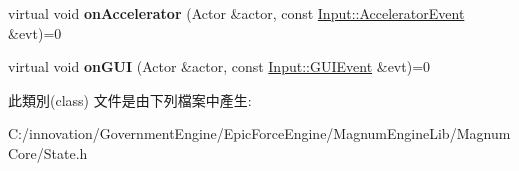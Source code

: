 \begin{DoxyCompactItemize}
\item 
virtual void {\bfseries on\+Accelerator} (Actor \&actor, const \hyperlink{class_i_dream_sky_1_1_input_1_1_accelerator_event}{Input\+::\+Accelerator\+Event} \&evt)=0\hypertarget{class_i_dream_sky_1_1_state_aa7955d6175516cc96d11dc4cf7b5e7d4}{}\label{class_i_dream_sky_1_1_state_aa7955d6175516cc96d11dc4cf7b5e7d4}

\item 
virtual void {\bfseries on\+G\+UI} (Actor \&actor, const \hyperlink{class_i_dream_sky_1_1_input_1_1_g_u_i_event}{Input\+::\+G\+U\+I\+Event} \&evt)=0\hypertarget{class_i_dream_sky_1_1_state_aeb95200592086d3e88f7a8d0bf58f264}{}\label{class_i_dream_sky_1_1_state_aeb95200592086d3e88f7a8d0bf58f264}

\end{DoxyCompactItemize}


此類別(class) 文件是由下列檔案中產生\+:\begin{DoxyCompactItemize}
\item 
C\+:/innovation/\+Government\+Engine/\+Epic\+Force\+Engine/\+Magnum\+Engine\+Lib/\+Magnum\+Core/State.\+h\end{DoxyCompactItemize}
